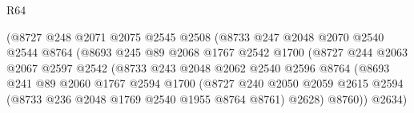 \begin{lexlean}{R64}
\begin{coremodule}
                                      (@8727
                                        @248
                                        @2071
                                        @2075
                                        @2545
                                        @2508
                                        (@8733
                                          @247
                                          @2048
                                          @2070
                                          @2540
                                          @2544
                                          @8764
                                          (@8693
                                            @245
                                            @89
                                            @2068
                                            @1767
                                            @2542
                                            @1700
                                            (@8727
                                              @244
                                              @2063
                                              @2067
                                              @2597
                                              @2542
                                              (@8733
                                                @243
                                                @2048
                                                @2062
                                                @2540
                                                @2596
                                                @8764
                                                (@8693
                                                  @241
                                                  @89
                                                  @2060
                                                  @1767
                                                  @2594
                                                  @1700
                                                  (@8727
                                                    @240
                                                    @2050
                                                    @2059
                                                    @2615
                                                    @2594
                                                    (@8733 @236 @2048 @1769 @2540 @1955 @8764 @8761)
                                                    @2628)
                                                  @8760))
                                              @2634)

\end{coremodule}
\end{lexlean}
